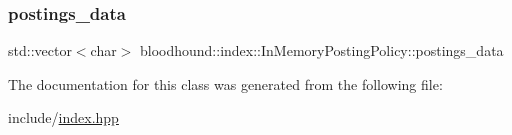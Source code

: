 \subsubsection{\texorpdfstring{postings\+\_\+data}{postings\_data}}
{\footnotesize\ttfamily std\+::vector$<$char$>$ bloodhound\+::index\+::\+In\+Memory\+Posting\+Policy\+::postings\+\_\+data\hspace{0.3cm}{\ttfamily [protected]}}



The documentation for this class was generated from the following file\+:\begin{DoxyCompactItemize}
\item 
include/\hyperlink{index_8hpp}{index.\+hpp}\end{DoxyCompactItemize}
